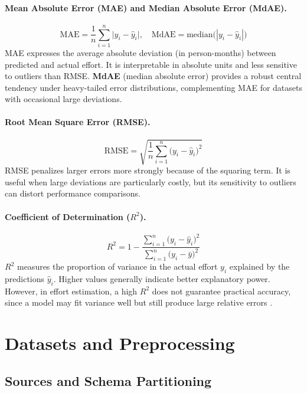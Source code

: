 \documentclass{ieeeaccess}
\begin{document}
\paragraph{Mean Absolute Error (MAE) and Median Absolute Error (MdAE).}
\begin{equation}
\mathrm{MAE} = \frac{1}{n}\sum_{i=1}^{n}\bigl|y_i-\hat{y}_i\bigr|, \quad
\mathrm{MdAE} = \text{median}\bigl(|y_i-\hat{y}_i|\bigr)
\label{eq:mae-mdae}
\end{equation}
MAE expresses the average absolute deviation (in person-months) between 
predicted and actual effort. It is interpretable in absolute units and less 
sensitive to outliers than RMSE. \textbf{MdAE} (median absolute error) provides 
a robust central tendency under heavy-tailed error distributions, 
complementing MAE for datasets with occasional large deviations.

\paragraph{Root Mean Square Error (RMSE).}
\begin{equation}
\mathrm{RMSE} = \sqrt{\frac{1}{n}\sum_{i=1}^{n}\bigl(y_i-\hat{y}_i\bigr)^2}
\label{eq:rmse}
\end{equation}
RMSE penalizes larger errors more strongly because of the squaring term. 
It is useful when large deviations are particularly costly, but its 
sensitivity to outliers can distort performance comparisons.

\paragraph{Coefficient of Determination ($R^2$).}
\begin{equation}
R^2 = 1 - \frac{\sum_{i=1}^{n}\bigl(y_i-\hat{y}_i\bigr)^2}{\sum_{i=1}^{n}\bigl(y_i-\bar{y}\bigr)^2}
\label{eq:r2}
\end{equation}
$R^2$ measures the proportion of variance in the actual effort $y_i$ 
explained by the predictions $\hat{y}_i$. Higher values generally indicate 
better explanatory power. However, in effort estimation, a high $R^2$ does 
not guarantee practical accuracy, since a model may fit variance well but 
still produce large relative errors \cite{kitchenham2001evaluating}.

\section{Datasets and Preprocessing}
\subsection{Sources and Schema Partitioning}
\label{sec:dataset-manifest}
\end{document}
